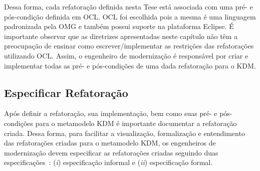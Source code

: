 Dessa forma, cada refatoração definida nesta Tese está associada com uma pré- e pós-condição definida em OCL. OCL foi escolhida pois a mesma é uma linguagem padronizada pela OMG e também possui suporte na plataforma Eclipse. É importante observar que as diretrizes apresentadas neste capítulo não têm a preocupação de ensinar como escrever/implementar as restrições das refatorações utilizando OCL. Assim, o engenheiro de modernização é responsável por criar e implementar todas as pré- e pós-condições de uma dada refatoração para o KDM.




\subsection{Especificar Refatoração}\label{sec:template_refatoracao}

Após definir a refatoração, sua implementação, bem como suas pré- e pós-condições para o metamodelo KDM é importante documentar a refatoração criada. Dessa forma, para facilitar a visualização, formalização e entendimento das refatorações criadas para o metamodelo KDM, os engenheiros de modernização devem especificar as refatorações criadas seguindo duas especificações~\cite{staron2004implementing}: (\textit{i}) especificação informal e (\textit{ii}) especificação formal. 

